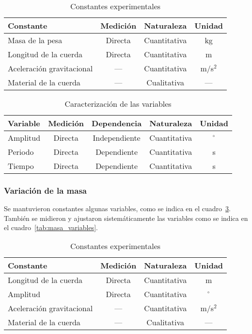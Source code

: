 \documentclass[letterpaper]{report}
\numberwithin{table}{section}
\begin{document}
\begin{table}[h!]
  \centering
  \begin{tabular}{lccc}
    \toprule
    \textbf{Constante} & \textbf{Medición} & \textbf{Naturaleza} &
    \textbf{Unidad}\\
    \midrule
    Masa de la pesa & Directa & Cuantitativa & kg \\
    Longitud de la cuerda & Directa & Cuantitativa & m \\
    Aceleración gravitacional & — & Cuantitativa & m/s$^{2}$ \\
    Material de la cuerda & — & Cualitativa & — \\
    \bottomrule
  \end{tabular}
  \caption{Constantes experimentales}\label{tab:amplitud_constantes}
\end{table}

\begin{table}[h!]
  \centering
  \begin{tabular}{lcccc}
    \toprule
    \textbf{Variable} & \textbf{Medición} & \textbf{Dependencia}
    & \textbf{Naturaleza} & \textbf{Unidad} \\
    \midrule
    Amplitud & Directa & Independiente & Cuantitativa & $^{\circ}$ \\
    Periodo & Directa & Dependiente & Cuantitativa & s \\
    Tiempo & Directa & Dependiente & Cuantitativa & s \\
    \bottomrule
  \end{tabular}
  \caption{Caracterización de las variables}\label{tab:amplitud_variables}
\end{table}

\subsubsection{Variación de la masa}

Se mantuvieron constantes algunas variables, como se indica en el
cuadro~\ref{tab:masa_constantes}. También se midieron y ajustaron
sistemáticamente las variables como se indica en el
cuadro~\ref{tab:masa_variables}.

\begin{table}[h!]
  \centering
  \begin{tabular}{lccc}
    \toprule
    \textbf{Constante} & \textbf{Medición} & \textbf{Naturaleza} &
    \textbf{Unidad}\\
    \midrule
    Longitud de la cuerda & Directa & Cuantitativa & m \\
    Amplitud & Directa & Cuantitativa & $^{\circ}$ \\
    Aceleración gravitacional & — & Cuantitativa & m/s$^{2}$ \\
    Material de la cuerda & — & Cualitativa & — \\
    \bottomrule
  \end{tabular}
  \caption{Constantes experimentales}\label{tab:masa_constantes}
\end{table}
\end{document}
